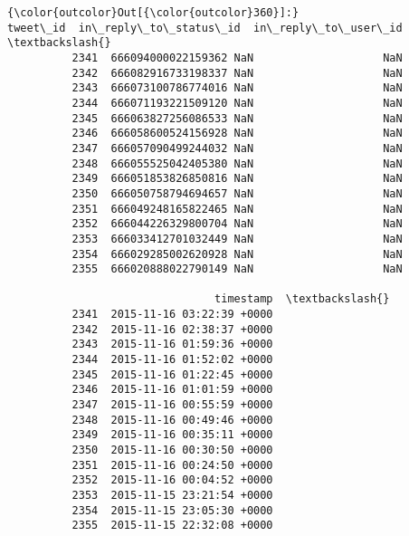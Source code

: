 \documentclass[11pt]{article}
\begin{document}
\begin{Verbatim}[commandchars=\\\{\}]
{\color{outcolor}Out[{\color{outcolor}360}]:}                 tweet\_id  in\_reply\_to\_status\_id  in\_reply\_to\_user\_id  \textbackslash{}
          2341  666094000022159362 NaN                    NaN                    
          2342  666082916733198337 NaN                    NaN                    
          2343  666073100786774016 NaN                    NaN                    
          2344  666071193221509120 NaN                    NaN                    
          2345  666063827256086533 NaN                    NaN                    
          2346  666058600524156928 NaN                    NaN                    
          2347  666057090499244032 NaN                    NaN                    
          2348  666055525042405380 NaN                    NaN                    
          2349  666051853826850816 NaN                    NaN                    
          2350  666050758794694657 NaN                    NaN                    
          2351  666049248165822465 NaN                    NaN                    
          2352  666044226329800704 NaN                    NaN                    
          2353  666033412701032449 NaN                    NaN                    
          2354  666029285002620928 NaN                    NaN                    
          2355  666020888022790149 NaN                    NaN                    
          
                                timestamp  \textbackslash{}
          2341  2015-11-16 03:22:39 +0000   
          2342  2015-11-16 02:38:37 +0000   
          2343  2015-11-16 01:59:36 +0000   
          2344  2015-11-16 01:52:02 +0000   
          2345  2015-11-16 01:22:45 +0000   
          2346  2015-11-16 01:01:59 +0000   
          2347  2015-11-16 00:55:59 +0000   
          2348  2015-11-16 00:49:46 +0000   
          2349  2015-11-16 00:35:11 +0000   
          2350  2015-11-16 00:30:50 +0000   
          2351  2015-11-16 00:24:50 +0000   
          2352  2015-11-16 00:04:52 +0000   
          2353  2015-11-15 23:21:54 +0000   
          2354  2015-11-15 23:05:30 +0000   
          2355  2015-11-15 22:32:08 +0000   
          

\end{Verbatim}
\end{document}
